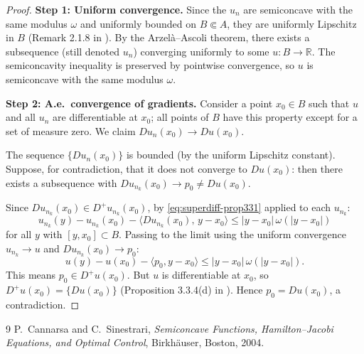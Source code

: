 \documentclass[a4paper,11pt,fleqn, draft]{book}
\theoremstyle{definition}
\theoremstyle{remark}
\begin{document}
\begin{proof}
\textbf{Step 1: Uniform convergence.}
Since the $u_n$ are semiconcave with the same modulus $\omega$ and uniformly bounded on $B \Subset A$, they are uniformly Lipschitz in $B$ (Remark 2.1.8 in \cite{cannarsa2004semiconcave}). By the Arzel\`a--Ascoli theorem, there exists a subsequence (still denoted $u_n$) converging uniformly to some $u : B \to \mathbb{R}$. The semiconcavity inequality is preserved by pointwise convergence, so $u$ is semiconcave with the same modulus $\omega$.

\medskip\noindent\textbf{Step 2: A.e.\ convergence of gradients.}
Consider a point $x_0 \in B$ such that $u$ and all $u_n$ are differentiable at $x_0$; all points of $B$ have this property except for a set of measure zero. We claim $Du_n(x_0) \to Du(x_0)$.

The sequence $\{Du_n(x_0)\}$ is bounded (by the uniform Lipschitz constant). Suppose, for contradiction, that it does not converge to $Du(x_0)$: then there exists a subsequence with $Du_{n_k}(x_0) \to p_0 \neq Du(x_0)$.

Since $Du_{n_k}(x_0) \in D^+ u_{n_k}(x_0)$, by \eqref{eq:superdiff-prop331} applied to each $u_{n_k}$:
\[
	u_{n_k}(y) - u_{n_k}(x_0) - \langle Du_{n_k}(x_0),\, y - x_0 \rangle \leqslant |y - x_0|\,\omega(|y - x_0|)
\]
for all $y$ with $[y, x_0] \subset B$. Passing to the limit using the uniform convergence $u_{n_k} \to u$ and $Du_{n_k}(x_0) \to p_0$:
\[
	u(y) - u(x_0) - \langle p_0, y - x_0 \rangle \leqslant |y - x_0|\,\omega(|y - x_0|).
\]
This means $p_0 \in D^+ u(x_0)$. But $u$ is differentiable at $x_0$, so $D^+ u(x_0) = \{Du(x_0)\}$ (Proposition 3.3.4(d) in \cite{cannarsa2004semiconcave}). Hence $p_0 = Du(x_0)$, a contradiction.
\end{proof}

\begin{thebibliography}{9}
P.~Cannarsa and C.~Sinestrari, \emph{Semiconcave Functions, Hamilton--Jacobi Equations, and Optimal Control}, Birkh\"auser, Boston, 2004.
\end{thebibliography}
\end{document}
